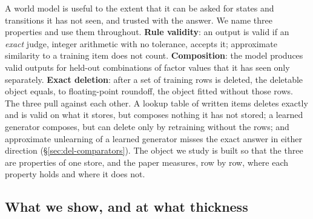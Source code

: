 \documentclass{article} %
\begin{document}
A world model is useful to the extent that it can be asked for states and transitions it
has not seen, and trusted with the answer. We name three properties and use them throughout.
\textbf{Rule validity}: an output is valid if an \emph{exact} judge, integer arithmetic with
no tolerance, accepts it; approximate similarity to a training item does not count.
\textbf{Composition}: the model produces valid outputs for held-out combinations of factor
values that it has seen only separately. \textbf{Exact deletion}: after a set of training rows
is deleted, the deletable object equals, to floating-point roundoff, the object fitted without
those rows. The three pull against each other. A lookup table of written items deletes
exactly and is valid on what it stores, but composes nothing it has not stored; a learned
generator composes, but can delete only by retraining without the rows; and approximate
unlearning of a learned generator misses the exact answer in either direction
(\S\ref{sec:del-comparators}). The object we study is built so that the three are properties
of one store, and the paper measures, row by row, where each property holds and where it does
not.

\subsection{What we show, and at what thickness}
\label{sec:contrib}
\end{document}
